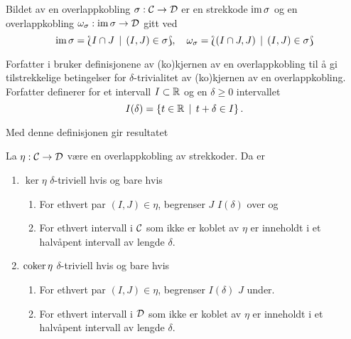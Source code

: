 \begin{teorem}\label{trm:im}
  Bildet av en overlappkobling $\sigma:\mathcal{C}\to\mathcal{D}$ er
  en strekkode $\textnormal{im}\,\sigma$ og en overlappkobling
  $\omega_\sigma:\textnormal{im}\,\sigma\to\mathcal{D}$ gitt ved
  \[\textnormal{im}\,\sigma = \Lbag I\cap J\,\mid\, (I,J)\in\sigma\Rbag,\quad
  \omega_\sigma = \Lbag (I\cap J, J)\,\mid\, (I,J)\in\sigma\Rbag\]
\end{teorem}

Forfatter i \citep{Bauer2020} bruker definisjonene av
(ko)kjernen av en overlappkobling til å gi tilstrekkelige
betingelser for $\delta$-trivialitet av (ko)kjernen av en
overlappkobling. Forfatter definerer for et intervall
$I\subset \mathbb{R}$ og en $\delta\geq0$ intervallet
\[I(\delta) = \left\{t\in\mathbb{R}\,\mid\,t+\delta\in I\right\}.\]

Med denne definisjonen gir \cite{Bauer2020} resultatet

\begin{proposition}
  La $\eta: \mathcal{C}\to\mathcal{D}$ være en overlappkobling av strekkoder. Da er
  \begin{enumerate}
    \item $\ker\eta$ $\delta$-triviell hvis og bare hvis
    \begin{enumerate}
      \item For ethvert par $(I,J)\in\eta$, begrenser $J$ $I(\delta)$ over og
      \item For ethvert intervall i $\mathcal{C}$ som ikke er koblet av $\eta$ er inneholdt i et halvåpent intervall av lengde $\delta$.
    \end{enumerate}
    \item $\textnormal{coker}\,\eta$ $\delta$-triviell hvis og bare hvis
    \begin{enumerate}
      \item For ethvert par $(I,J)\in\eta$, begrenser $I(\delta)$ $J$ under.
      \item For ethvert intervall i $\mathcal{D}$ som ikke er koblet av $\eta$ er inneholdt i et halvåpent intervall av lengde $\delta$.
    \end{enumerate}
  \end{enumerate}
\end{proposition}



